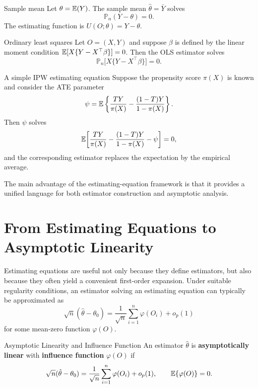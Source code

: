 \documentclass[master.tex]{subfiles}
\begin{document}
\begin{example}{Sample mean}
\label{w9:ex:mean}
Let $\theta = \mathbb{E}(Y)$.  The sample mean $\hat\theta = \bar Y$ solves
\[
  \mathbb{P}_n(Y-\theta) = 0.
\]
The estimating function is $U(O;\theta) = Y - \theta$.
\end{example}

\begin{example}{Ordinary least squares}
\label{w9:ex:ols}
Let $O = (X,Y)$ and suppose $\beta$ is defined by the linear moment
condition $\mathbb{E}[X\{Y - X^\top\beta\}] = 0$.  Then the OLS estimator
solves
\[
  \mathbb{P}_n\bigl[X\{Y - X^\top\beta\}\bigr] = 0.
\]
\end{example}

\begin{example}{A simple IPW estimating equation}
\label{w9:ex:ipw-ee}
Suppose the propensity score $\pi(X)$ is known and consider the ATE
parameter
\[
  \psi = \mathbb{E}\left\{\frac{TY}{\pi(X)} - \frac{(1-T)Y}{1-\pi(X)}\right\}.
\]
Then $\psi$ solves
\[
  \mathbb{E}\!\left[\frac{TY}{\pi(X)} - \frac{(1-T)Y}{1-\pi(X)} - \psi\right] = 0,
\]
and the corresponding estimator replaces the expectation by the
empirical average.
\end{example}

The main advantage of the estimating-equation framework is that it
provides a unified language for both estimator construction and
asymptotic analysis.

\section{From Estimating Equations to Asymptotic Linearity}
\label{w9:sec:asymlin}

Estimating equations are useful not only because they define estimators,
but also because they often yield a convenient first-order expansion.
Under suitable regularity conditions, an estimator solving an
estimating equation can typically be approximated as
\[
  \sqrt{n}(\hat\theta - \theta_0)
  =
  \frac{1}{\sqrt{n}}\sum_{i=1}^n \varphi(O_i) + o_p(1)
\]
for some mean-zero function $\varphi(O)$.

\begin{defn}{Asymptotic Linearity and Influence Function}
\label{w9:defn:asymlin}
An estimator $\hat\theta$ is \textbf{asymptotically linear} with
\textbf{influence function} $\varphi(O)$ if
\[
  \sqrt{n}(\hat\theta - \theta_0)
  =
  \frac{1}{\sqrt{n}}\sum_{i=1}^n \varphi(O_i) + o_p(1),
  \qquad
  \mathbb{E}\{\varphi(O)\} = 0.
\]
\end{defn}
\end{document}

